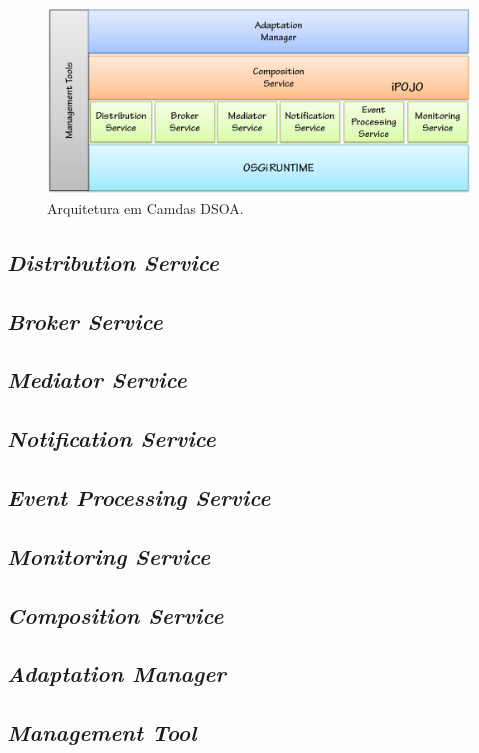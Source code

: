 \begin{figure}[htp]
\centering
\includegraphics[width=13cm]{chapters/chapter3/dsoa-arch.png}
\caption[Arquitetura em Camdas DSOA]{Arquitetura em Camdas DSOA.}
\label{fig:proposal}
\end{figure}

\subsection{\textit{Distribution Service}}

\subsection{\textit{Broker Service}}

\subsection{\textit{Mediator Service}}

\subsection{\textit{Notification Service}}

\subsection{\textit{Event Processing Service}}
\label{subsec:cep}

\subsection{\textit{Monitoring Service}}
\label{subsec:monit_serv}

\subsection{\textit{Composition Service}}

\subsection{\textit{Adaptation Manager}}

\subsection{\textit{Management Tool}}

